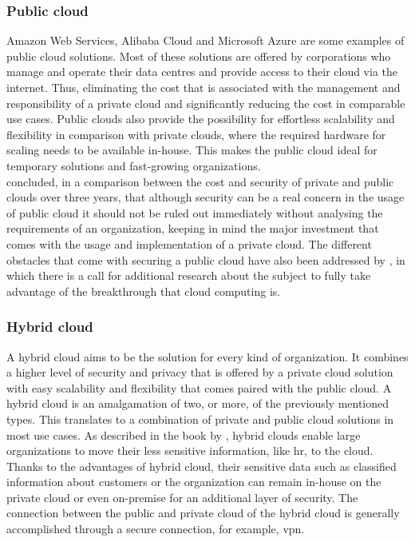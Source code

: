 \subsubsection{Public cloud}
Amazon Web Services, Alibaba Cloud and Microsoft Azure are some examples of public cloud solutions. 
Most of these solutions are offered by corporations who manage and operate their data centres and provide access to their cloud via the internet. 
Thus, eliminating the cost that is associated with the management and responsibility of a private cloud and significantly reducing the cost in comparable use cases. 
Public clouds also provide the possibility for effortless scalability and flexibility in comparison with private clouds, where the required hardware for scaling needs to be available in-house. 
This makes the public cloud ideal for temporary solutions and fast-growing organizations.
\\
\textcite{Singh2012} concluded, in a comparison between the cost and security of private and public clouds over three years, that although security can be a real concern in the usage of public cloud it should not be ruled out immediately without analysing the requirements of an organization, keeping in mind the major investment that comes with the usage and implementation of a private cloud.  
The different obstacles that come with securing a public cloud have also been addressed by \textcite{Ren2012}, in which there is a call for additional research about the subject to fully take advantage of the breakthrough that cloud computing is. 

\subsubsection{Hybrid cloud}
A hybrid cloud aims to be the solution for every kind of organization. 
It combines a higher level of security and privacy that is offered by a private cloud solution with easy scalability and flexibility that comes paired with the public cloud. 
A hybrid cloud is an amalgamation of two, or more, of the previously mentioned types. 
This translates to a combination of private and public cloud solutions in most use cases. 
As described in the book by \textcite{Sarna2010}, hybrid clouds enable large organizations to move their less sensitive information, like \acrfull{hr}, to the cloud. 
Thanks to the advantages of hybrid cloud, their sensitive data such as classified information about customers or the organization can remain in-house on the private cloud or even on-premise for an additional layer of security.
The connection between the public and private cloud of the hybrid cloud is generally accomplished through a secure connection, for example, \acrfull{vpn}.

